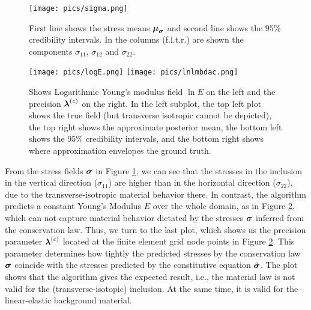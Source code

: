 \begin{figure}
    \centering
    \texttt{[image: pics/sigma.png]}
    \caption{First line shows the stress means $\boldsymbol{\mu}_{\boldsymbol{\sigma}}$ and second line shows the $95\%$ credibility intervals. In the columns (f.l.t.r.) are shown the components $\sigma_{11}$, $\sigma_{12}$ and $\sigma_{22}$. }
    \label{fig:sigma}
\end{figure}

\begin{figure}
    \centering
    \texttt{[image: pics/logE.png]}
    \hfill
    \texttt{[image: pics/lnlmbdac.png]}
    \caption{Shows Logarithmic Young's modulus field $\ln E$ on the left and the precision $\boldsymbol{\lambda}^{(c)}$ on the right. In the left subplot, the top left plot shows the true field (but transverse isotropic cannot be depicted), the top right shows the approximate posterior mean, the bottom left shows the $95\%$ credibility intervals, and the bottom right shows where approximation envelopes the ground truth.}
    \label{fig:E_lame}
\end{figure}

From the stress fields $\boldsymbol{\sigma}$ in Figure \ref{fig:sigma}, we can see that the stresses in the inclusion in the vertical direction ($\sigma_{11}$) are higher than in the horizontal direction ($\sigma_{22}$), due to the transverse-isotropic material behavior there. In contrast, the algorithm predicts a constant Young's Modulus $E$ over the whole domain, as in Figure \ref{fig:E_lame}, which can not capture material behavior dictated by the stresses $\boldsymbol{\sigma}$ inferred from the conservation law. Thus, we turn to the last plot, which shows us the precision parameter $\boldsymbol{\lambda}^{(c)}$ located at the finite element grid node points in Figure \ref{fig:E_lame}. This parameter determines how tightly the predicted stresses by the conservation law $\boldsymbol{\sigma}$ coincide with the stresses predicted by the constitutive equation $\tilde{\boldsymbol{\sigma}}$. The plot shows that the algorithm gives the expected result, i.e., the material law is not valid for the (transverse-isotopic) inclusion. At the same time, it is valid for the linear-elastic background material.


